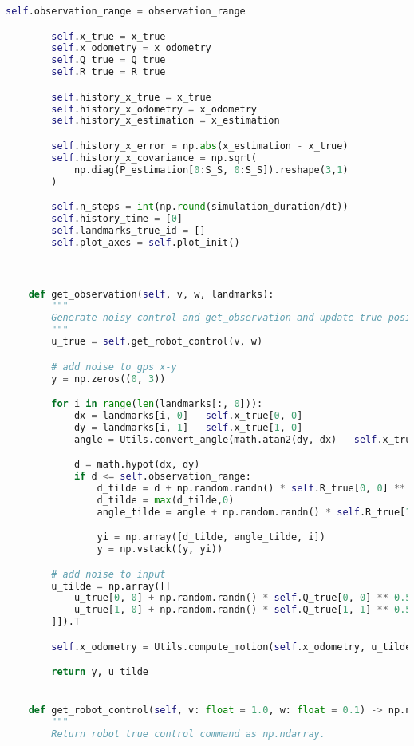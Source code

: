 \documentclass[../CSC_5RO12_TA_TP4.tex]{subfiles}
\begin{document}
\begin{scriptsize}
\begin{lstlisting}[language=Python]
        self.observation_range = observation_range

        self.x_true = x_true
        self.x_odometry = x_odometry
        self.Q_true = Q_true
        self.R_true = R_true

        self.history_x_true = x_true
        self.history_x_odometry = x_odometry
        self.history_x_estimation = x_estimation

        self.history_x_error = np.abs(x_estimation - x_true)
        self.history_x_covariance = np.sqrt(
            np.diag(P_estimation[0:S_S, 0:S_S]).reshape(3,1)
        )

        self.n_steps = int(np.round(simulation_duration/dt))
        self.history_time = [0]
        self.landmarks_true_id = []
        self.plot_axes = self.plot_init()



    def get_observation(self, v, w, landmarks):
        """
        Generate noisy control and get_observation and update true position and dead reckoning
        """
        u_true = self.get_robot_control(v, w)

        # add noise to gps x-y
        y = np.zeros((0, 3))

        for i in range(len(landmarks[:, 0])):
            dx = landmarks[i, 0] - self.x_true[0, 0]
            dy = landmarks[i, 1] - self.x_true[1, 0]
            angle = Utils.convert_angle(math.atan2(dy, dx) - self.x_true[2, 0])

            d = math.hypot(dx, dy)
            if d <= self.observation_range:
                d_tilde = d + np.random.randn() * self.R_true[0, 0] ** 0.5  # add noise
                d_tilde = max(d_tilde,0)
                angle_tilde = angle + np.random.randn() * self.R_true[1, 1] ** 0.5  # add noise

                yi = np.array([d_tilde, angle_tilde, i])
                y = np.vstack((y, yi))

        # add noise to input
        u_tilde = np.array([[
            u_true[0, 0] + np.random.randn() * self.Q_true[0, 0] ** 0.5,
            u_true[1, 0] + np.random.randn() * self.Q_true[1, 1] ** 0.5
        ]]).T

        self.x_odometry = Utils.compute_motion(self.x_odometry, u_tilde, self.dt)

        return y, u_tilde


    def get_robot_control(self, v: float = 1.0, w: float = 0.1) -> np.ndarray[float]:
        """
        Return robot true control command as np.ndarray.


\end{lstlisting}
\end{scriptsize}
\end{document}
